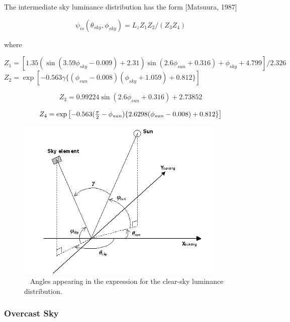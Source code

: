 The intermediate sky luminance distribution has the form {[}Matsuura, 1987{]}

\begin{equation}
{\psi_{is}}\left( {{\theta_{sky}},{\phi_{sky}}} \right) = {L_z}{Z_1}{Z_2}/({Z_3}{Z_4})
\end{equation}

where

\({Z_1} = \left[ {1.35(\sin (3.59{\phi_{sky}} - 0.009) + 2.31)\sin (2.6{\phi_{sun}} + 0.316) + {\phi_{sky}} + 4.799} \right]/2.326\) \({Z_2} = \exp \left[ { - 0.563\gamma \{ ({\phi_{sun}} - 0.008)({\phi_{sky}} + 1.059) + 0.812\} } \right]\)

\begin{equation}
{Z_3} = 0.99224\sin (2.6{\phi_{sun}} + 0.316) + 2.73852
\end{equation}

\begin{equation}
{Z_4} = \exp \left[ { - 0.563({\textstyle{\pi  \over 2}} - {\phi_{sun}})\{ 2.6298({\phi_{sun}} - 0.008) + 0.812\} } \right]
\end{equation}

\begin{figure}[hbtp] %
\centering
\includegraphics[width=0.9\textwidth, height=0.9\textheight, keepaspectratio=true]{media/image733.png}
\caption{  Angles appearing in the expression for the clear-sky luminance distribution. \protect \label{fig:angles-appearing-in-the-expression-for}}
\end{figure}

\subsubsection{Overcast Sky}\label{overcast-sky}

